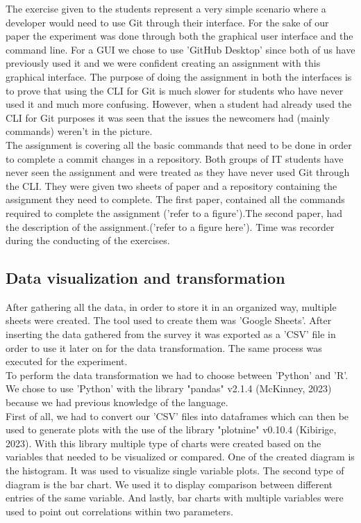 \documentclass[]{report}
\begin{document}
	
	The exercise given to the students represent a very simple scenario where a developer would need to use Git through their interface. For the sake of our paper the experiment was done through both the graphical user interface and the command line. For a GUI we chose to use 'GitHub Desktop' since both of us have previously used it and we were confident creating an assignment with this graphical interface. The purpose of doing the assignment in both the interfaces is to prove that using the CLI for Git is much slower for students who have never used it and much more confusing. However, when a student had already used the CLI for Git purposes it was seen that the issues the newcomers had (mainly commands) weren't in the picture.\\
	
	The assignment is covering all the basic commands that need to be done in order to complete a commit changes in a repository. Both groups of IT students have never seen the assignment and were treated as they have never used Git through the CLI. They were given two sheets of paper and a repository containing the assignment they need to complete. The first paper, contained all the commands required to complete the assignment ('refer to a figure').The second paper, had the description of the assignment.('refer to a figure here'). Time was recorder during the conducting of the exercises.
	
	
	\subsection{Data visualization and transformation}
	After gathering all the data, in order to store it in an organized way, multiple sheets were created. The tool used to create them was 'Google Sheets'. After inserting the data gathered from the survey it was exported as a 'CSV' file in order to use it later on for the data transformation. The same process was executed for the experiment. \\
	
	To perform the data transformation we had to choose between 'Python' and 'R'. We chose to use 'Python' with the library "pandas" v2.1.4 (McKinney, 2023) because we had previous knowledge of the language. \\
	
	First of all, we had to convert our 'CSV' files into dataframes which can then be used to generate plots with the use of the library "plotnine" v0.10.4 (Kibirige, 2023).  With this library multiple type of charts were created based on the variables that needed to be visualized or compared. One of the created diagram is the histogram. It was used to visualize single variable plots. The second type of diagram is the bar chart. We used it to display comparison between different entries of the same variable. And lastly, bar charts with multiple variables were used to point out correlations within two parameters.
	
\end{document}
